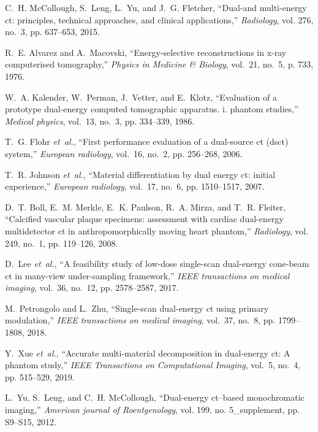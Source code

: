 \documentclass[journal,twoside,web]{ieeecolor}
\begin{document}

\begin{thebibliography}{10}

C.~H. McCollough, S.~Leng, L.~Yu, and J.~G. Fletcher, ``Dual-and multi-energy
  ct: principles, technical approaches, and clinical applications,''
  \emph{Radiology}, vol. 276, no.~3, pp. 637--653, 2015.

R.~E. Alvarez and A.~Macovski, ``Energy-selective reconstructions in x-ray
  computerised tomography,'' \emph{Physics in Medicine \& Biology}, vol.~21,
  no.~5, p. 733, 1976.

W.~A. Kalender, W.~Perman, J.~Vetter, and E.~Klotz, ``Evaluation of a prototype
  dual-energy computed tomographic apparatus. i. phantom studies,''
  \emph{Medical physics}, vol.~13, no.~3, pp. 334--339, 1986.

T.~G. Flohr \emph{et~al.}, ``First performance evaluation of a dual-source ct
  (dsct) system,'' \emph{European radiology}, vol.~16, no.~2, pp. 256--268,
  2006.

T.~R. Johnson \emph{et~al.}, ``Material differentiation by dual energy ct:
  initial experience,'' \emph{European radiology}, vol.~17, no.~6, pp.
  1510--1517, 2007.

D.~T. Boll, E.~M. Merkle, E.~K. Paulson, R.~A. Mirza, and T.~R. Fleiter,
  ``Calcified vascular plaque specimens: assessment with cardiac dual-energy
  multidetector ct in anthropomorphically moving heart phantom,''
  \emph{Radiology}, vol. 249, no.~1, pp. 119--126, 2008.

D.~Lee \emph{et~al.}, ``A feasibility study of low-dose single-scan dual-energy
  cone-beam ct in many-view under-sampling framework,'' \emph{IEEE transactions
  on medical imaging}, vol.~36, no.~12, pp. 2578--2587, 2017.

M.~Petrongolo and L.~Zhu, ``Single-scan dual-energy ct using primary
  modulation,'' \emph{IEEE transactions on medical imaging}, vol.~37, no.~8,
  pp. 1799--1808, 2018.

Y.~Xue \emph{et~al.}, ``Accurate multi-material decomposition in dual-energy
  ct: A phantom study,'' \emph{IEEE Transactions on Computational Imaging},
  vol.~5, no.~4, pp. 515--529, 2019.

L.~Yu, S.~Leng, and C.~H. McCollough, ``Dual-energy ct--based monochromatic
  imaging,'' \emph{American journal of Roentgenology}, vol. 199, no.
  5\_supplement, pp. S9--S15, 2012.


\end{thebibliography}
\end{document}
